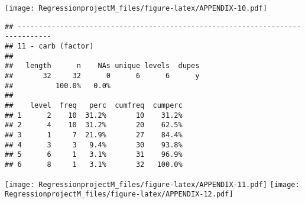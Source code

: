 \documentclass[
]{article}
\begin{document}
\texttt{[image: RegressionprojectM\_files/figure-latex/APPENDIX-10.pdf]}

\begin{verbatim}
## ------------------------------------------------------------------------------ 
## 11 - carb (factor)
## 
##   length      n    NAs unique levels  dupes
##       32     32      0      6      6      y
##          100.0%   0.0%                     
## 
##    level  freq   perc  cumfreq  cumperc
## 1      2    10  31.2%       10    31.2%
## 2      4    10  31.2%       20    62.5%
## 3      1     7  21.9%       27    84.4%
## 4      3     3   9.4%       30    93.8%
## 5      6     1   3.1%       31    96.9%
## 6      8     1   3.1%       32   100.0%
\end{verbatim}

\texttt{[image: RegressionprojectM\_files/figure-latex/APPENDIX-11.pdf]}
\texttt{[image: RegressionprojectM\_files/figure-latex/APPENDIX-12.pdf]}
\end{document}
